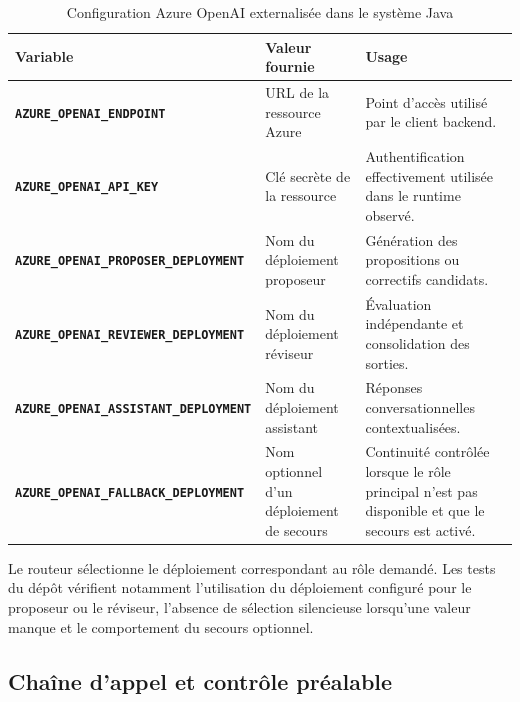 \begin{table}[H]
    \centering
    \caption{Configuration Azure OpenAI externalisée dans le système Java}
    \label{tab:configuration-azure-ch4}
    \scriptsize
    \begin{tabularx}{\textwidth}{|>{\bfseries\RaggedRight\arraybackslash}p{4.8cm}|>{\RaggedRight\arraybackslash}p{3.5cm}|>{\RaggedRight\arraybackslash}X|}
        \hline
        \rowcolor{cgilight!95}
        \textbf{Variable} & \textbf{Valeur fournie} & \textbf{Usage} \\
        \hline
        \nolinkurl{AZURE_OPENAI_ENDPOINT} & URL de la ressource Azure & Point d'accès utilisé par le client backend. \\
        \hline
        \nolinkurl{AZURE_OPENAI_API_KEY} & Clé secrète de la ressource & Authentification effectivement utilisée dans le runtime observé. \\
        \hline
        \nolinkurl{AZURE_OPENAI_PROPOSER_DEPLOYMENT} & Nom du déploiement proposeur & Génération des propositions ou correctifs candidats. \\
        \hline
        \nolinkurl{AZURE_OPENAI_REVIEWER_DEPLOYMENT} & Nom du déploiement réviseur & Évaluation indépendante et consolidation des sorties. \\
        \hline
        \nolinkurl{AZURE_OPENAI_ASSISTANT_DEPLOYMENT} & Nom du déploiement assistant & Réponses conversationnelles contextualisées. \\
        \hline
        \nolinkurl{AZURE_OPENAI_FALLBACK_DEPLOYMENT} & Nom optionnel d'un déploiement de secours & Continuité contrôlée lorsque le rôle principal n'est pas disponible et que le secours est activé. \\
        \hline
    \end{tabularx}
\end{table}

Le routeur sélectionne le déploiement correspondant au rôle demandé. Les tests du dépôt vérifient notamment l'utilisation du déploiement configuré pour le proposeur ou le réviseur, l'absence de sélection silencieuse lorsqu'une valeur manque et le comportement du secours optionnel.

\subsection{Chaîne d'appel et contrôle préalable}

